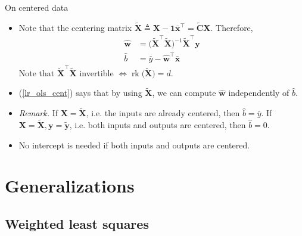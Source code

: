 \documentclass{beamer}
\numberwithin{equation}{section}
\newcommand{\aref}[1]{\alert{\ref{#1}}}
\begin{document}
\begin{frame}{On centered data}
    \begin{itemize}
        \item
        Note that the centering matrix $ \tilde{\mathbf{X}} \triangleq
        \mathbf{X} - \mathbf{1}\bar{\mathbf{x}}^\top =
        \tilde{\mathbf{C}}\mathbf{X} $. Therefore,
        \begin{equation} \label{lr_ols_cent}
            \begin{split}
                \hat{\mathbf{w}} & = \big(
	                \tilde{\mathbf{X}}^\top\tilde{\mathbf{X}}
	            \big)^{-1}\tilde{\mathbf{X}}^\top\mathbf{y} \\
	            \hat{b} & = \bar{y} - \hat{\mathbf{w}}^\top\bar{\mathbf{x}}
            \end{split}
        \end{equation}
        Note that $ \tilde{\mathbf{X}}^\top\tilde{\mathbf{X}} $ invertible
        $ \Leftrightarrow \operatorname{rk}\big(\tilde{\mathbf{X}}\big) = d $.

        \item
        (\aref{lr_ols_cent}) says that by using $ \tilde{\mathbf{X}} $, we can
        compute $ \hat{\mathbf{w}} $ independently of $ \hat{b} $.

        \item
        \textit{Remark.} If $ \mathbf{X} = \tilde{\mathbf{X}} $, i.e. the
        inputs are already centered, then $ \hat{b} = \bar{y} $. If
        $ \mathbf{X} = \tilde{\mathbf{X}}, \mathbf{y} = \tilde{\mathbf{y}} $,
        i.e. both inputs and outputs are centered, then $ \hat{b} = 0 $.

        \item
        \alert{No intercept is needed if both inputs and outputs are centered.}
    \end{itemize}
\end{frame}

\section{Generalizations}

\subsection{Weighted least squares}
\end{document}
